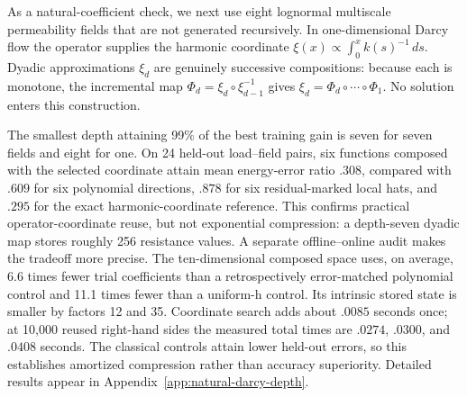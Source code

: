 \documentclass[11pt]{article}
\numberwithin{algorithm}{section}
\theoremstyle{definition}\newtheorem{definition}[theorem]{Definition}
\theoremstyle{remark}\newtheorem{remark}[theorem]{Remark}
\begin{document}
As a natural-coefficient check, we next use eight lognormal multiscale
permeability fields that are not generated recursively.  In one-dimensional
Darcy flow the operator supplies the harmonic coordinate
$\xi(x)\propto\int_0^x k(s)^{-1}\,ds$.  Dyadic approximations $\xi_d$ are
genuinely successive compositions: because each is monotone, the incremental
map $\Phi_d=\xi_d\circ\xi_{d-1}^{-1}$ gives
$\xi_d=\Phi_d\circ\cdots\circ\Phi_1$.  No solution enters this construction.

The smallest depth attaining 99\% of the best training gain is seven for
seven fields and eight for one.  On 24 held-out load--field pairs, six
functions composed with the selected coordinate attain mean energy-error
ratio $.308$, compared with $.609$ for six polynomial directions, $.878$ for
six residual-marked local hats, and $.295$ for the exact harmonic-coordinate
reference.  This confirms practical operator-coordinate reuse, but not
exponential compression: a depth-seven dyadic map stores roughly 256
resistance values.  A separate offline--online audit makes the tradeoff more
precise.  The ten-dimensional composed space uses, on average, 6.6 times
fewer trial coefficients than a retrospectively error-matched polynomial
control and 11.1 times fewer than a uniform-h control.  Its intrinsic stored
state is smaller by factors 12 and 35.  Coordinate search adds about $.0085$
seconds once; at 10,000 reused right-hand sides the measured total times are
$.0274$, $.0300$, and $.0408$ seconds.  The classical controls attain lower
held-out errors, so this establishes amortized compression rather than
accuracy superiority.  Detailed results appear in
Appendix~\ref{app:natural-darcy-depth}.
\end{document}
